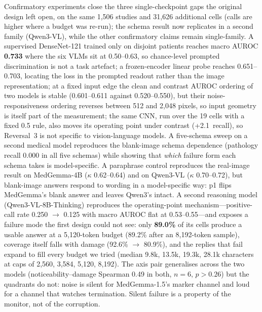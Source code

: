 Confirmatory experiments close the three single-checkpoint gaps the original design left open, on the same 1,506 studies and 31,626 additional cells (calls are higher where a budget was re-run); the schema result now replicates in a second family (Qwen3-VL), while the other confirmatory claims remain single-family. A supervised DenseNet-121 trained only on disjoint patients reaches macro AUROC \textbf{0.733} where the six VLMs sit at 0.50--0.63, so chance-level prompted discrimination is not a task artefact; a frozen-encoder linear probe reaches 0.651--0.703, locating the loss in the prompted readout rather than the image representation; at a fixed input edge the clean and contrast AUROC ordering of two models is stable (0.601--0.611 against 0.520--0.550), but their noise-responsiveness ordering reverses between 512 and 2,048 pixels, so input geometry is itself part of the measurement; the same CNN, run over the 19 cells with a fixed 0.5 rule, also moves its operating point under contrast (+2.1\,\pp{} recall), so Reversal~3 is not specific to vision-language models. A five-schema sweep on a second medical model reproduces the blank-image schema dependence (pathology recall 0.000 in all five schemas) while showing that \emph{which} failure form each schema takes is model-specific. A paraphrase control reproduces the real-image result on MedGemma-4B ($\kappa$ 0.62--0.64) and on Qwen3-VL ($\kappa$ 0.70--0.72), but blank-image answers respond to wording in a model-specific way: p1 flips MedGemma's blank answer and leaves Qwen3's intact. A second reasoning model (Qwen3-VL-8B-Thinking) reproduces the operating-point mechanism---positive-call rate 0.250 $\rightarrow$ 0.125 with macro AUROC flat at 0.53--0.55---and exposes a failure mode the first design could not see: only \textbf{89.0\%} of its cells produce a usable answer at a 5,120-token budget (89.2\% after an 8,192-token sample), coverage itself falls with damage (92.6\% $\rightarrow$ 80.9\%), and the replies that fail expand to fill every budget we tried (median 9.8k, 13.5k, 19.3k, 28.1k characters at caps of 2,560, 3,584, 5,120, 8,192). The axis pair generalises across the two models (noticeability--damage Spearman 0.49 in both, $n=6$, $p>0.26$) but the quadrants do not: noise is silent for MedGemma-1.5's marker channel and loud for a channel that watches termination. Silent failure is a property of the monitor, not of the corruption.

